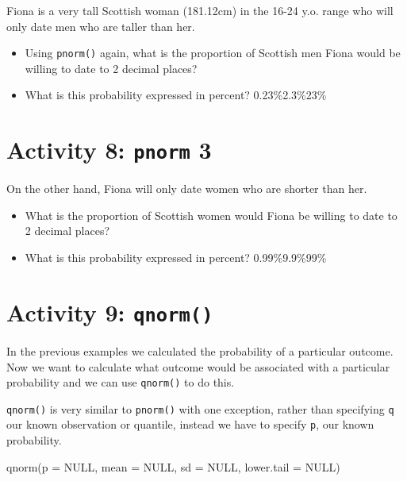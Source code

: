 \documentclass[
  oneside]{book}
\newenvironment{Shaded}{\begin{snugshade}}{\end{snugshade}}
\newcommand{\AttributeTok}[1]{\textcolor[rgb]{0.77,0.63,0.00}{#1}}
\newcommand{\ConstantTok}[1]{\textcolor[rgb]{0.00,0.00,0.00}{#1}}
\newcommand{\FunctionTok}[1]{\textcolor[rgb]{0.00,0.00,0.00}{#1}}
\newcommand{\NormalTok}[1]{#1}
\providecommand{\tightlist}{%
  \setlength{\itemsep}{0pt}\setlength{\parskip}{0pt}}
\begin{document}
Fiona is a very tall Scottish woman (181.12\nbsp{}cm) in the 16-24 y.o. range who will only date men who are taller than her.

\begin{itemize}
\tightlist
\item
  Using \texttt{pnorm()} again, what is the proportion of Scottish men Fiona would be willing to date to 2 decimal places? \\
\item
  What is this probability expressed in percent? 0.23\%2.3\%23\%
\end{itemize}

\hypertarget{activity-8-pnorm-3}{%
\section{\texorpdfstring{Activity 8: \texttt{pnorm} 3}{Activity 8: pnorm 3}}\label{activity-8-pnorm-3}}

On the other hand, Fiona will only date women who are shorter than her.

\begin{itemize}
\tightlist
\item
  What is the proportion of Scottish women would Fiona be willing to date to 2 decimal places? \\
\item
  What is this probability expressed in percent? 0.99\%9.9\%99\%
\end{itemize}

\hypertarget{activity-9-qnorm}{%
\section{\texorpdfstring{Activity 9: \texttt{qnorm()}}{Activity 9: qnorm()}}\label{activity-9-qnorm}}

In the previous examples we calculated the probability of a particular outcome. Now we want to calculate what outcome would be associated with a particular probability and we can use \texttt{qnorm()} to do this.

\texttt{qnorm()} is very similar to \texttt{pnorm()} with one exception, rather than specifying \texttt{q} our known observation or quantile, instead we have to specify \texttt{p}, our known probability.

\begin{Shaded}
\begin{Highlighting}[]
\FunctionTok{qnorm}\NormalTok{(}\AttributeTok{p =} \ConstantTok{NULL}\NormalTok{, }\AttributeTok{mean =} \ConstantTok{NULL}\NormalTok{, }\AttributeTok{sd =} \ConstantTok{NULL}\NormalTok{, }\AttributeTok{lower.tail =} \ConstantTok{NULL}\NormalTok{)}
\end{Highlighting}
\end{Shaded}
\end{document}
